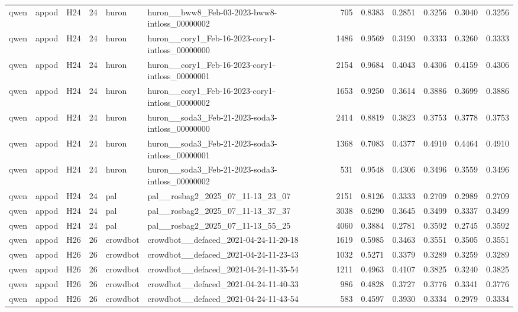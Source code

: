 \begin{table}[tbp]
\begin{tabular}{lllrllrrrrrr}
qwen & appod & H24 & 24 & huron & huron\_\_bww8\_Feb-03-2023-bww8-intloss\_00000002 & 705 & 0.8383 & 0.2851 & 0.3256 & 0.3040 & 0.3256 \\
qwen & appod & H24 & 24 & huron & huron\_\_cory1\_Feb-16-2023-cory1-intloss\_00000000 & 1486 & 0.9569 & 0.3190 & 0.3333 & 0.3260 & 0.3333 \\
qwen & appod & H24 & 24 & huron & huron\_\_cory1\_Feb-16-2023-cory1-intloss\_00000001 & 2154 & 0.9684 & 0.4043 & 0.4306 & 0.4159 & 0.4306 \\
qwen & appod & H24 & 24 & huron & huron\_\_cory1\_Feb-16-2023-cory1-intloss\_00000002 & 1653 & 0.9250 & 0.3614 & 0.3886 & 0.3699 & 0.3886 \\
qwen & appod & H24 & 24 & huron & huron\_\_soda3\_Feb-21-2023-soda3-intloss\_00000000 & 2414 & 0.8819 & 0.3823 & 0.3753 & 0.3778 & 0.3753 \\
qwen & appod & H24 & 24 & huron & huron\_\_soda3\_Feb-21-2023-soda3-intloss\_00000001 & 1368 & 0.7083 & 0.4377 & 0.4910 & 0.4464 & 0.4910 \\
qwen & appod & H24 & 24 & huron & huron\_\_soda3\_Feb-21-2023-soda3-intloss\_00000002 & 531 & 0.9548 & 0.4306 & 0.3496 & 0.3559 & 0.3496 \\
qwen & appod & H24 & 24 & pal & pal\_\_rosbag2\_2025\_07\_11-13\_23\_07 & 2151 & 0.8126 & 0.3333 & 0.2709 & 0.2989 & 0.2709 \\
qwen & appod & H24 & 24 & pal & pal\_\_rosbag2\_2025\_07\_11-13\_37\_37 & 3038 & 0.6290 & 0.3645 & 0.3499 & 0.3337 & 0.3499 \\
qwen & appod & H24 & 24 & pal & pal\_\_rosbag2\_2025\_07\_11-13\_55\_25 & 4060 & 0.3884 & 0.2781 & 0.3592 & 0.2745 & 0.3592 \\
qwen & appod & H26 & 26 & crowdbot & crowdbot\_\_defaced\_2021-04-24-11-20-18 & 1619 & 0.5985 & 0.3463 & 0.3551 & 0.3505 & 0.3551 \\
qwen & appod & H26 & 26 & crowdbot & crowdbot\_\_defaced\_2021-04-24-11-23-43 & 1032 & 0.5271 & 0.3379 & 0.3289 & 0.3259 & 0.3289 \\
qwen & appod & H26 & 26 & crowdbot & crowdbot\_\_defaced\_2021-04-24-11-35-54 & 1211 & 0.4963 & 0.4107 & 0.3825 & 0.3240 & 0.3825 \\
qwen & appod & H26 & 26 & crowdbot & crowdbot\_\_defaced\_2021-04-24-11-40-33 & 986 & 0.4828 & 0.3727 & 0.3776 & 0.3341 & 0.3776 \\
qwen & appod & H26 & 26 & crowdbot & crowdbot\_\_defaced\_2021-04-24-11-43-54 & 583 & 0.4597 & 0.3930 & 0.3334 & 0.2979 & 0.3334 \\

\end{tabular}
\end{table}
